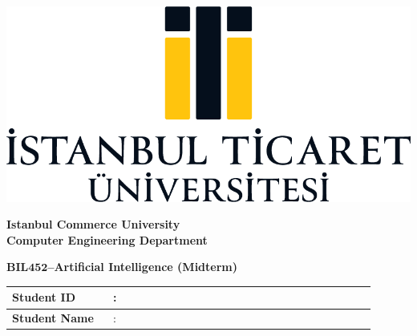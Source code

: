 \documentclass[a4paper, 11pt]{article}
\begin{document}
	\thispagestyle{empty}
	\begin{minipage}[c]{\textwidth}
		\begin{minipage}[c]{0.3\textwidth}
			\centering
			\includegraphics[width=\textwidth]{logo.png}
		\end{minipage}%
		\begin{minipage}[c]{0.7\textwidth}
			\centering
			{\LARGE \textbf{Istanbul Commerce University}}\\[1em]
			{\Large \textbf{Computer Engineering Department}}
		\end{minipage}
	\end{minipage}
	
	\begin{center}
		\Large
		\textbf{BIL$\bm{452}$--Artificial Intelligence (Midterm)}
	\end{center}
	
	\begin{table}[!ht]
		\renewcommand{\arraystretch}{2}
		\centering
		\begin{tabular}{@{}|L{0.25\linewidth} C{0.05\linewidth} p{0.60\linewidth}|@{}}
			\hline
			\textbf{Student ID}& : & ~ \\ \hline
			\textbf{Student Name}  & : & ~ \\ \hline
		\end{tabular}
	\end{table}
	
\end{document}
